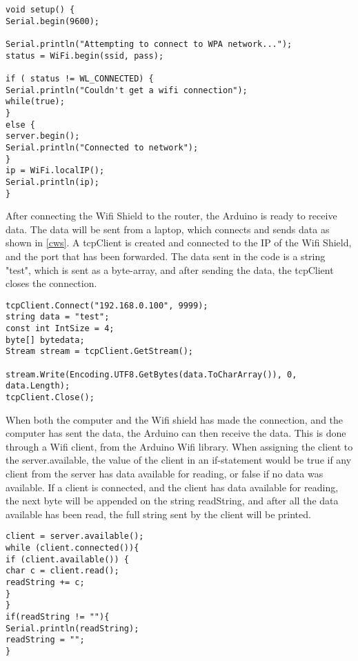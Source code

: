 \begin{lstlisting}[caption={Connecting the Wifi shield to the network}, label={ws}]
void setup() {
Serial.begin(9600);

Serial.println("Attempting to connect to WPA network...");
status = WiFi.begin(ssid, pass);

if ( status != WL_CONNECTED) { 
Serial.println("Couldn't get a wifi connection");
while(true);
} 
else {
server.begin();
Serial.println("Connected to network");
}
ip = WiFi.localIP();
Serial.println(ip);
}
\end{lstlisting}

After connecting the Wifi Shield to the router, the Arduino is ready to receive data. The data will be sent from a laptop, which connects and sends data as shown in \ref{cws}. A tcpClient is created and connected to the IP of the Wifi Shield, and the port that has been forwarded. The data sent in the code is a string "test", which is sent as a byte-array, and after sending the data, the tcpClient closes the connection.

\begin{lstlisting}[caption={Connecting the computer to the Wifi Shield}, label={cws}]
tcpClient.Connect("192.168.0.100", 9999);
string data = "test";
const int IntSize = 4;
byte[] bytedata;
Stream stream = tcpClient.GetStream();

stream.Write(Encoding.UTF8.GetBytes(data.ToCharArray()), 0, data.Length);
tcpClient.Close();
\end{lstlisting}

When both the computer and the Wifi shield has made the connection, and the computer has sent the data, the Arduino can then receive the data. This is done through a Wifi client, from the Arduino Wifi library. When assigning the client to the server.available, the value of the client in an if-statement would be true if any client from the server has data available for reading, or false if no data was available. If a client is connected, and the client has data available for reading, the next byte will be appended on the string readString, and after all the data available has been read, the full string sent by the client will be printed.

\begin{lstlisting}[caption={Receiving data from the computer}, label={rdc}]
client = server.available();
while (client.connected()){
if (client.available()) {
char c = client.read(); 
readString += c;
}
}
if(readString != ""){
Serial.println(readString);
readString = "";
}
\end{lstlisting}

